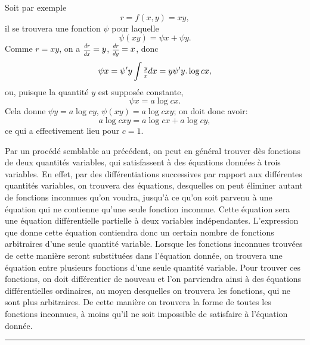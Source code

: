 \documentclass[oneside, 12 pt, leqno]{memoir}
\let\oldfrac\frac
\def\frac#1#2{\mathchoice{\text{\scalebox{.83}{${\oldfrac{#1}{#2}}$}}}{\text{\scalebox{.83}{${\displaystyle\oldfrac{#1}{#2}}$}}}{\genfrac{}{}{}{2}{#1}{#2}}{\genfrac{}{}{}{3}{#1}{#2}}}
\begin{document}
Soit par exemple
\[r=f(x, y)=x y,\]
il se trouvera une fonction \(\psi\) pour laquelle
\[\psi(x y)=\psi x+\psi y.\]
Comme \(r=x y\), on a \(\frac{d r}{d x}=y\), \(\frac{d r}{d y}=x\), donc
\[\psi x=\psi^{\prime} y \int \frac{y}{x} d x=y \psi^{\prime} y. \log c x,\]
ou, puisque la quantité \(y\) est supposée constante,
\[\psi x=a \log c x.\]
Cela donne \(\psi y=a \log c y\), \(\psi(x y)=a \log c x y\); on doit donc avoir:
\[a \log c x y=a \log c x+a \log c y,\]
ce qui a effectivement lieu pour \(c=1\).

Par un procédé semblable au précédent, on peut en général trouver dès fonctions de deux quantités variables, qui satisfassent à des équations données à trois variables. En effet, par des différentiations successives par rapport aux différentes quantités variables, on trouvera des équations, desquelles on peut éliminer autant de fonctions inconnues qu'on voudra, jusqu'à ce qu'on soit parvenu à une équation qui ne contienne qu'une seule fonction inconnue. Cette équation sera une équation différentielle partielle à deux variables indépendantes. L'expression que donne cette équation contiendra donc un certain nombre de fonctions arbitraires d'une seule quantité variable. Lorsque les fonctions inconnues trouvées de cette manière seront substituées dans l'équation donnée, on trouvera une équation entre plusieurs fonctions d'une seule quantité variable. Pour trouver ces fonctions, on doit différentier de nouveau et l'on parviendra ainsi à des équations différentielles ordinaires, au moyen desquelles on trouvera les fonctions, qui ne sont plus arbitraires. De cette manière on trouvera la forme de toutes les fonctions inconnues, à moins qu'il ne soit impossible de satisfaire à l'équation donnée.
\begin{center}
\rule{2in}{0.1pt}
\end{center}
\end{document}
